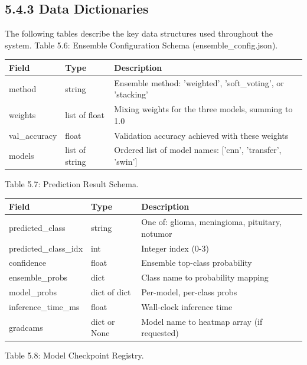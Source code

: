 \documentclass[12pt,a4paper,oneside]{report}
\begin{document}
\subsection*{5.4.3 Data Dictionaries}
The following tables describe the key data structures used throughout the system.
Table 5.6: Ensemble Configuration Schema (ensemble\_config.json).
\begin{center}
\small
\begin{tabularx}{\textwidth}{YYY}
\toprule
\textbf{Field} & \textbf{Type} & \textbf{Description} \\
\midrule
method & string & Ensemble method: 'weighted', 'soft\_voting', or 'stacking' \\
weights & list of float & Mixing weights for the three models, summing to 1.0 \\
val\_accuracy & float & Validation accuracy achieved with these weights \\
models & list of string & Ordered list of model names: ['cnn', 'transfer', 'swin'] \\
\bottomrule
\end{tabularx}
\end{center}
Table 5.7: Prediction Result Schema.
\begin{center}
\small
\begin{tabularx}{\textwidth}{YYY}
\toprule
\textbf{Field} & \textbf{Type} & \textbf{Description} \\
\midrule
predicted\_class & string & One of: glioma, meningioma, pituitary, notumor \\
predicted\_class\_idx & int & Integer index (0-3) \\
confidence & float & Ensemble top-class probability \\
ensemble\_probs & dict & Class name to probability mapping \\
model\_probs & dict of dict & Per-model, per-class probs \\
inference\_time\_ms & float & Wall-clock inference time \\
gradcams & dict or None & Model name to heatmap array (if requested) \\
\bottomrule
\end{tabularx}
\end{center}
Table 5.8: Model Checkpoint Registry.
\end{document}

